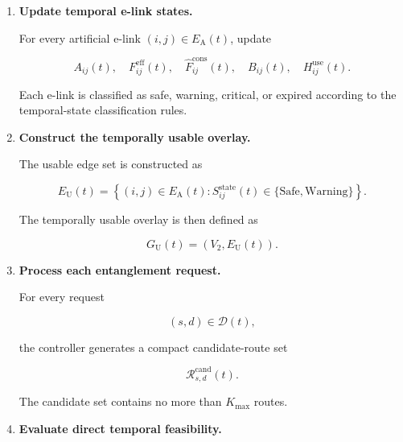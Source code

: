\begin{enumerate}

\item \textbf{Update temporal e-link states.}

For every artificial e-link $(i,j)\in E_{\mathrm{A}}(t)$, update

\begin{equation}
    A_{ij}(t),
    \quad
    F_{ij}^{\mathrm{eff}}(t),
    \quad
    \widehat{F}_{ij}^{\mathrm{cons}}(t),
    \quad
    B_{ij}(t),
    \quad
    H_{ij}^{\mathrm{use}}(t).
\end{equation}

Each e-link is classified as safe, warning, critical, or expired according to the temporal-state classification rules.


\item \textbf{Construct the temporally usable overlay.}

The usable edge set is constructed as

\begin{equation}
    E_{\mathrm{U}}(t)
    =
    \left\{
    (i,j)
    \in
    E_{\mathrm{A}}(t)
    :
    S_{ij}^{\mathrm{state}}(t)
    \in
    \{
    \mathrm{Safe},
    \mathrm{Warning}
    \}
    \right\}.
\end{equation}

The temporally usable overlay is then defined as

\begin{equation}
    G_{\mathrm{U}}(t)
    =
    \left(
    V_2,
    E_{\mathrm{U}}(t)
    \right).
\end{equation}


\item \textbf{Process each entanglement request.}

For every request

\begin{equation}
    (s,d)
    \in
    \mathcal{D}(t),
\end{equation}

the controller generates a compact candidate-route set

\begin{equation}
    \mathcal{R}_{s,d}^{\mathrm{cand}}(t).
\end{equation}

The candidate set contains no more than $K_{\max}$ routes.


\item \textbf{Evaluate direct temporal feasibility.}


\end{enumerate}

